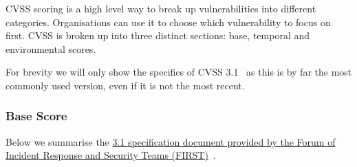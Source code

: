 CVSS scoring is a high level way to break up vulnerabilities into different categories. Organisations can use it to choose which vulnerability to focus on first. CVSS is broken up into three distinct sections: base, temporal and environmental scores.

For brevity we will only show the specifics of CVSS 3.1~\cite{CVSS_31} as this is by far the most commonly used version, even if it is not the most recent.

\subsubsection{Base Score}

Below we summarise the
\href{https://www.first.org/cvss/v3.1/specification-document}{3.1 specification document
	provided by the  Forum of Incident Response and Security Teams (FIRST)}~\cite{CVSS_31}.


